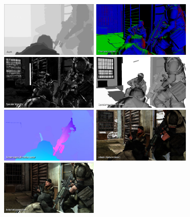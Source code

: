 \begin{figure}[!]
    \centering
    \includegraphics[width=175px]{images/graphics/killzone-2-buffer-depth.jpg}
    \includegraphics[width=175px]{images/graphics/killzone-2-buffer-vsn.jpg}
    \includegraphics[width=175px]{images/graphics/killzone-2-buffer-specular.jpg}
    \includegraphics[width=175px]{images/graphics/killzone-2-buffer-specular-rough.jpg}
    \includegraphics[width=175px]{images/graphics/killzone-2-buffer-ss-motion.jpg}
    \includegraphics[width=175px]{images/graphics/killzone-2-buffer-albedo.jpg}
    \includegraphics[width=175px]{images/graphics/killzone-2-buffer-composed-result.jpg}

\end{figure}
